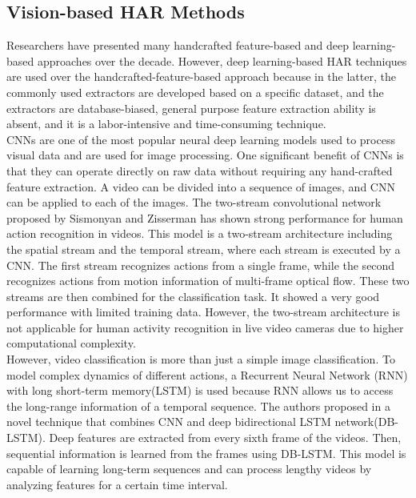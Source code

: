 \documentclass[twocolumn]{article}
\begin{document}
\subsection{Vision-based HAR Methods}
Researchers have presented many handcrafted feature-based and deep learning-based approaches over the decade. However, deep learning-based HAR techniques are used over
the handcrafted-feature-based approach because in the latter, the commonly used extractors are developed based on a specific dataset, and the extractors are database-biased, general
purpose feature extraction ability is absent, and it is a labor-intensive and time-consuming technique.\\
CNNs are one of the most popular neural deep learning models used to process visual data and are used for image processing. One significant benefit of CNNs
is that they can operate directly on raw data without requiring any hand-crafted feature extraction. A video can be divided into a sequence of images, and CNN
can be applied to each of the images. The two-stream convolutional network proposed by Sismonyan and Zisserman \cite{b4} has shown strong performance
for human action recognition in videos. This model is a two-stream architecture including the spatial stream and the temporal stream, where each stream is executed by a
CNN. The first stream recognizes actions from a single frame, while the second recognizes actions from motion information of multi-frame optical flow. These two streams
are then combined for the classification task. It showed a very good performance with limited training data. However, the two-stream architecture is not applicable for human
activity recognition in live video cameras due to higher computational complexity.\\
However, video classification is more than just a simple image classification. To model complex dynamics of different actions, a Recurrent Neural Network (RNN) with long short-term memory(LSTM)
is used because RNN allows us to access the long-range information of a temporal sequence.
The authors proposed in \cite{b5} a novel technique that combines CNN and deep bidirectional LSTM network(DB-LSTM). Deep features are extracted from every sixth frame of the
videos. Then, sequential information is learned from the frames using DB-LSTM. This model is capable of learning long-term sequences and can process lengthy videos
by analyzing features for a certain time interval.
\end{document}
